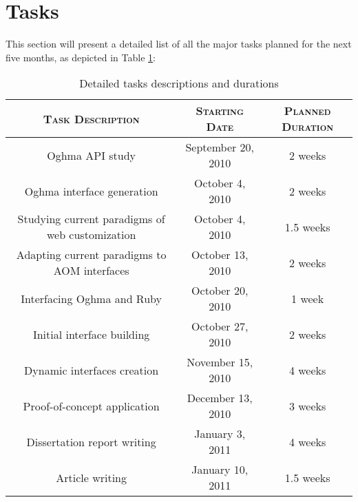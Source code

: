 \section{Tasks}\label{sec:tasks}

This section will present a detailed list of all the major tasks planned for the next five months, as depicted in Table \ref{table:tasks}:

\begin{table}[H]
  \centering
  \begin{tabular}{c|c|c}
    \textbf{\textsc{Task Description}} & \textbf{\textsc{Starting Date}} & \textbf{\textsc{Planned Duration}}\\
    \hline
    \hline
    Oghma API study                                 & September 20, 2010  & 2 weeks\\\hline
    Oghma interface generation                      & October 4, 2010     & 2 weeks\\\hline
    Studying current paradigms of web customization & October 4, 2010     & 1.5 weeks\\\hline
    Adapting current paradigms to AOM interfaces    & October 13, 2010    & 2 weeks\\\hline
    Interfacing Oghma and Ruby                      & October 20, 2010    & 1 week\\\hline
    Initial interface building                      & October 27, 2010    & 2 weeks\\\hline
    Dynamic interfaces creation                     & November 15, 2010   & 4 weeks\\\hline
    Proof-of-concept application                    & December 13, 2010   & 3 weeks\\\hline
    Dissertation report writing                     & January 3, 2011     & 4 weeks\\\hline
    Article writing                                 & January 10, 2011    & 1.5 weeks\\\hline
  \end{tabular}
  \vspace{3mm}
  \caption{Detailed tasks descriptions and durations}
  \label{table:tasks}
\end{table}

